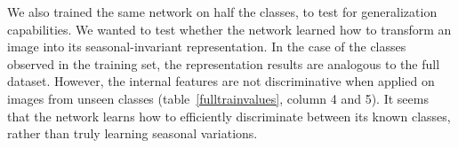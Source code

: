 We also trained the same network on half the classes, to test for generalization capabilities. We wanted to test whether the network learned how to transform an image into its seasonal-invariant representation. %
In the case of the classes observed in the training set, the representation results are analogous to the full dataset. However, the internal features are not discriminative when applied on images from unseen classes (table~\ref{fulltrainvalues}, column 4 and 5). It seems that the network learns how to efficiently discriminate between its known classes, rather than truly learning seasonal variations.

